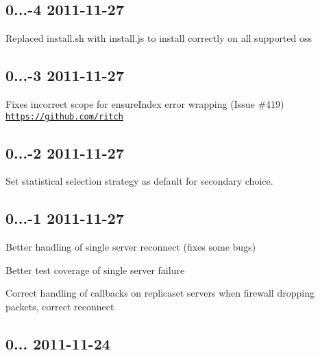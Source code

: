 \subsection*{0...-\/4 2011-\/11-\/27 }


\begin{DoxyItemize}
\item Replaced install.\+sh with install.\+js to install correctly on all supported os\textquotesingle{}s
\end{DoxyItemize}

\subsection*{0...-\/3 2011-\/11-\/27 }


\begin{DoxyItemize}
\item Fixes incorrect scope for ensure\+Index error wrapping (Issue \#419) \href{https://github.com/ritch}{\tt https\+://github.\+com/ritch}
\end{DoxyItemize}

\subsection*{0...-\/2 2011-\/11-\/27 }


\begin{DoxyItemize}
\item Set statistical selection strategy as default for secondary choice.
\end{DoxyItemize}

\subsection*{0...-\/1 2011-\/11-\/27 }


\begin{DoxyItemize}
\item Better handling of single server reconnect (fixes some bugs)
\item Better test coverage of single server failure
\item Correct handling of callbacks on replicaset servers when firewall dropping packets, correct reconnect
\end{DoxyItemize}

\subsection*{0... 2011-\/11-\/24 }


